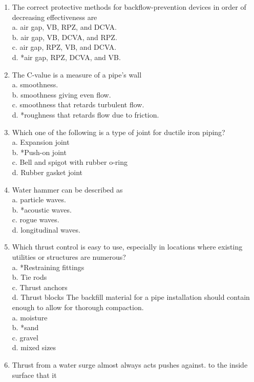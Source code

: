 \begin{enumerate}[1.]
\item The correct protective methods for backflow-prevention devices in order of decreasing effectiveness are\\
a. air gap, VB, RPZ, and DCVA.\\
b. air gap, VB, DCVA, and RPZ.\\
c. air gap, RPZ, VB, and DCVA.\\
d. *air gap, RPZ, DCVA, and VB.\\
\item The $\mathrm{C}$-value is a measure of a pipe's wall\\
a. smoothness.\\
b. smoothness giving even flow.\\
c. smoothness that retards turbulent flow.\\
d. *roughness that retards flow due to friction.\\
\item Which one of the following is a type of joint for ductile iron piping?\\
a. Expansion joint\\
b. *Push-on joint\\
c. Bell and spigot with rubber o-ring\\
d. Rubber gasket joint\\
\item Water hammer can be described as\\
a. particle waves.\\
b. *acoustic waves.\\
c. rogue waves.\\
d. longitudinal waves.\\
\item Which thrust control is easy to use, especially in locations where existing utilities or structures are numerous?\\
a. *Restraining fittings\\
b. Tie rods\\
c. Thrust anchors\\
d. Thrust blocks
The backfill material for a pipe installation should contain enough to allow for thorough compaction.\\
a. moisture\\
b. *sand\\
c. gravel\\
d. mixed sizes\\
\item Thrust from a water surge almost always acts pushes against. to the inside surface that it\\

\end{enumerate}
